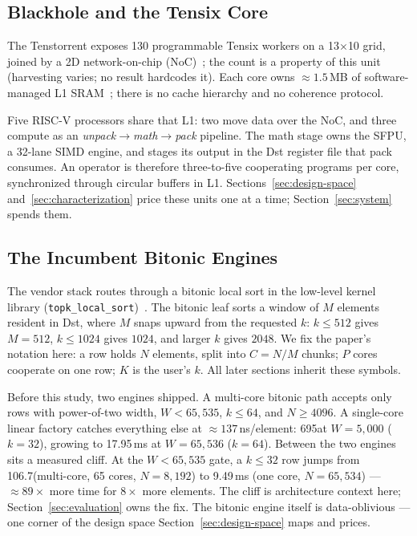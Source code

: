 \subsection{Blackhole and the Tensix Core}
\label{sec:bg-tensix}

The Tenstorrent \bh \pca exposes 130 programmable Tensix workers on a
13$\times$10 grid, joined by a 2D network-on-chip
(NoC)~\cite{vasiljevic2024blackhole}; the count is a property of
this unit (harvesting varies; no result hardcodes it). Each
core owns
${\approx}1.5$\,MB of software-managed L1 SRAM~\cite{vasiljevic2024blackhole};
there is no cache hierarchy and no coherence protocol.

Five RISC-V processors share that L1: two move data over the NoC, and
three compute as an
\emph{unpack}$\to$\emph{math}$\to$\emph{pack} pipeline. The math stage
owns the SFPU, a 32-lane SIMD engine, and
stages its output in the Dst register file that pack consumes. An operator is therefore
three-to-five cooperating programs per core, synchronized through
circular buffers in L1.
Sections~\ref{sec:design-space} and~\ref{sec:characterization} price these
units one at a time; Section~\ref{sec:system} spends them.

\subsection{The Incumbent Bitonic Engines}
\label{sec:bg-incumbent}

The vendor stack routes \ttnntopk through a bitonic local sort in the
low-level kernel library
(\texttt{topk\_local\_sort})~\cite{ttnn_topk_docs,ttmetal_topk_issue33492}.
The bitonic leaf sorts a window of $M$ elements resident in Dst, where $M$
snaps upward from the requested $k$: $k\le512$ gives $M{=}512$, $k\le1024$
gives $1024$, and larger $k$ gives $2048$. We fix the paper's notation here:
a row holds $N$ elements, split into $C = N/M$ chunks; $P$ cores cooperate on
one row; $K$ is the user's $k$. All later sections inherit these symbols.

Before this study, two engines shipped. A multi-core bitonic path accepts
only rows with power-of-two width, $W < 65{,}535$, $k \le 64$, and
$N \ge 4096$. A single-core linear factory catches everything else at
${\approx}137$\,ns/element: 695\us at $W{=}5{,}000$ ($k{=}32$), growing to
17.95\,ms at $W{=}65{,}536$ ($k{=}64$). Between the two engines sits a
measured cliff. At the $W < 65{,}535$ gate, a $k\le32$ row jumps from
106.7\us (multi-core, 65 cores, $N{=}8{,}192$) to 9.49\,ms (one core,
$N{=}65{,}534$) --- ${\approx}89\times$ more time for $8\times$ more
elements. The cliff is architecture context here;
Section~\ref{sec:evaluation} owns the fix. The bitonic engine itself is
data-oblivious --- one corner of the design space
Section~\ref{sec:design-space} maps and prices.

